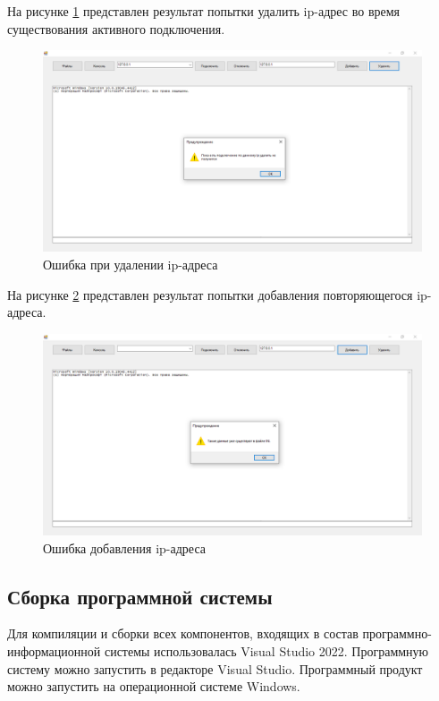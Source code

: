 На рисунке \ref{15:image} представлен результат попытки удалить ip-адрес во время существования активного подключения.
\begin{figure}
	\centering
	\includegraphics[width=1\linewidth]{"images/15"}
	\caption{Ошибка при удалении ip-адреса}
	\label{15:image}
\end{figure}

На рисунке \ref{16:image} представлен результат попытки добавления повторяющегося ip-адреса.

\begin{figure}
	\centering
	\includegraphics[width=1\linewidth]{"images/16"}
	\caption{Ошибка добавления ip-адреса}
	\label{16:image}
\end{figure}

\subsection{Сборка программной системы}

Для компиляции и сборки всех компонентов, входящих в состав
программно-информационной системы использовалась Visual Studio 2022.
Программную систему можно запустить в редакторе Visual Studio.
Программный продукт можно запустить на операционной системе Windows.